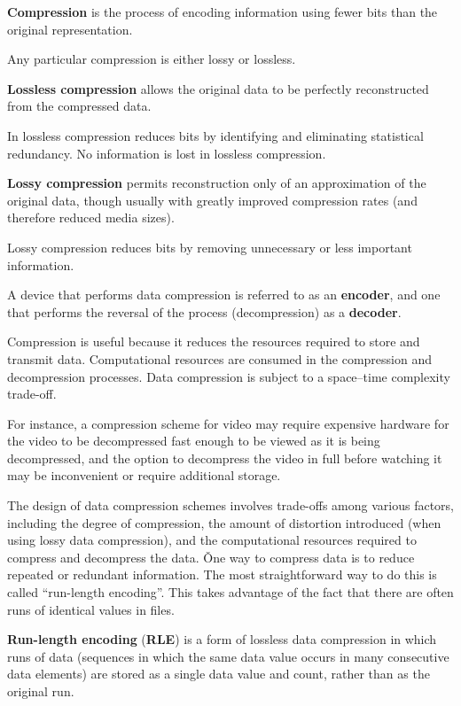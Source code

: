 \bd[Compression]
\textbf{Compression} is the process of encoding information using fewer bits than the original representation.
\ed

Any particular compression is either lossy or lossless.


\textbf{Lossless compression} allows the original data to be perfectly reconstructed from the compressed data.
\ed

In lossless compression reduces bits by identifying and eliminating statistical redundancy. No information is lost in
lossless compression.

\textbf{Lossy compression} permits reconstruction only of an approximation of the original data, though usually with
greatly improved compression rates (and therefore reduced media sizes).
\ed

Lossy compression reduces bits by removing unnecessary or less important information.

A device that performs data compression is referred to as an \textbf{encoder}, and one that performs the reversal of
the process (decompression) as a \textbf{decoder}.
\ed

Compression is useful because it reduces the resources required to store and transmit data. Computational resources
are consumed in the compression and decompression processes. Data compression is subject to a space–time complexity
trade-off.

\be
For instance, a compression scheme for video may require expensive hardware for the video to be decompressed fast
enough to be viewed as it is being decompressed, and the option to decompress the video in full before watching it
may be inconvenient or require additional storage.
\ee

The design of data compression schemes involves trade-offs among various factors, including the degree of
compression, the amount of distortion introduced (when using lossy data compression), and the computational resources
required to compress and decompress the data. \v

One way to compress data is to reduce repeated or redundant information. The most straightforward way to do this is
called ``run-length encoding''. This takes advantage of the fact that there are often runs of identical values in files.

\textbf{Run-length encoding} (\textbf{RLE}) is a form of lossless data compression in which runs of data (sequences
in which the same data value occurs in many consecutive data elements) are stored as a single data value and count,
rather than as the original run.
\ed

